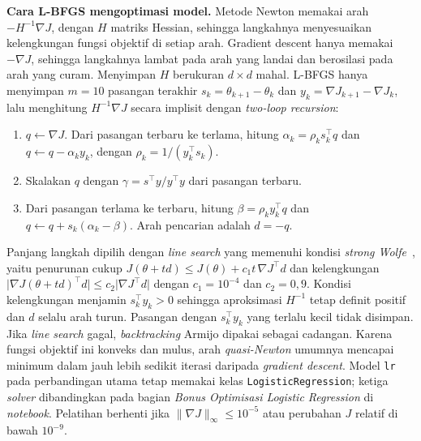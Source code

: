 \textbf{Cara L-BFGS mengoptimasi model.} Metode Newton memakai arah
$-H^{-1}\nabla J$, dengan $H$ matriks Hessian, sehingga langkahnya menyesuaikan
kelengkungan fungsi objektif di setiap arah. Gradient descent hanya memakai
$-\nabla J$, sehingga langkahnya lambat pada arah yang landai dan berosilasi pada
arah yang curam. Menyimpan $H$ berukuran $d\times d$ mahal. L-BFGS hanya
menyimpan $m=10$ pasangan terakhir $s_k=\theta_{k+1}-\theta_k$ dan
$y_k=\nabla J_{k+1}-\nabla J_k$, lalu menghitung $H^{-1}\nabla J$ secara implisit
dengan \textit{two-loop recursion}:
\begin{enumerate}
	\item $q\leftarrow\nabla J$. Dari pasangan terbaru ke terlama, hitung
	$\alpha_k=\rho_k s_k^\top q$ dan $q\leftarrow q-\alpha_k y_k$, dengan
	$\rho_k=1/(y_k^\top s_k)$.
	\item Skalakan $q$ dengan $\gamma=s^\top y/y^\top y$ dari pasangan terbaru.
	\item Dari pasangan terlama ke terbaru, hitung $\beta=\rho_k y_k^\top q$ dan
	$q\leftarrow q+s_k(\alpha_k-\beta)$. Arah pencarian adalah $d=-q$.
\end{enumerate}
Panjang langkah dipilih dengan \textit{line search} yang memenuhi kondisi
\textit{strong Wolfe}~\cite{wolfram2026stepcontrol}, yaitu penurunan cukup
$J(\theta+td)\le J(\theta)+c_1t\,\nabla J^\top d$ dan kelengkungan
$\lvert\nabla J(\theta+td)^\top d\rvert\le c_2\lvert\nabla J^\top d\rvert$ dengan
$c_1=10^{-4}$ dan $c_2=0{,}9$. Kondisi kelengkungan menjamin $s_k^\top y_k>0$
sehingga aproksimasi $H^{-1}$ tetap definit positif dan $d$ selalu arah turun.
Pasangan dengan $s_k^\top y_k$ yang terlalu kecil tidak disimpan. Jika
\textit{line search} gagal, \textit{backtracking} Armijo dipakai sebagai
cadangan. Karena fungsi objektif ini konveks dan mulus, arah
\textit{quasi-Newton} umumnya mencapai minimum dalam jauh lebih sedikit iterasi
daripada \textit{gradient descent}. Model \texttt{lr} pada perbandingan utama tetap
memakai kelas \texttt{LogisticRegression}; ketiga \textit{solver} dibandingkan pada
bagian \textit{Bonus Optimisasi Logistic Regression} di \textit{notebook}. Pelatihan berhenti jika $\lVert\nabla J\rVert_\infty\le10^{-5}$
atau perubahan $J$ relatif di bawah $10^{-9}$.





